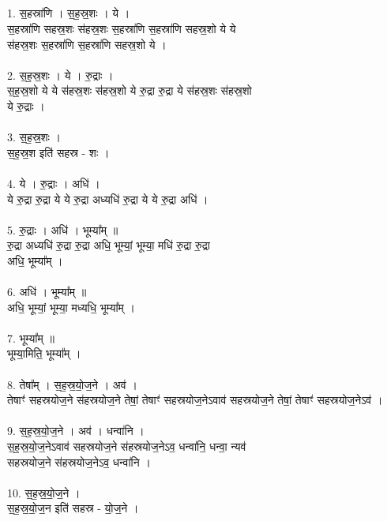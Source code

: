 \subsection{}
1. स॒हस्रा॑णि । स॒ह॒स्र॒शः । ये ।\\
स॒हस्रा॑णि सहस्र॒शः स॑हस्र॒शः स॒हस्रा॑णि स॒हस्रा॑णि सहस्र॒शो ये ये\\
स॑हस्र॒शः स॒हस्रा॑णि स॒हस्रा॑णि सहस्र॒शो ये ।\\
\\
2. स॒ह॒स्र॒शः । ये । रु॒द्राः ।\\
स॒ह॒स्र॒शो ये ये स॑हस्र॒शः स॑हस्र॒शो ये रु॒द्रा रु॒द्रा ये स॑हस्र॒शः स॑हस्र॒शो\\
ये रु॒द्राः ।\\
\\
3. स॒ह॒स्र॒शः ।\\
स॒ह॒स्र॒श इति॑ सहस्र - शः ।\\
\\
4. ये । रु॒द्राः । अधि॑ ।\\
ये रु॒द्रा रु॒द्रा ये ये रु॒द्रा अध्यधि॑ रु॒द्रा ये ये रु॒द्रा अधि॑ ।\\
\\
5. रु॒द्राः । अधि॑ । भूम्या᳚म् ॥\\
रु॒द्रा अध्यधि॑ रु॒द्रा रु॒द्रा अधि॒ भूम्यां॒ भूम्या॒ मधि॑ रु॒द्रा रु॒द्रा\\
अधि॒ भूम्या᳚म् ।\\
\\
6. अधि॑ । भूम्या᳚म् ॥\\
अधि॒ भूम्यां॒ भूम्या॒ मध्यधि॒ भूम्या᳚म् ।\\
\\
7. भूम्या᳚म् ॥\\
भूम्या॒मिति॒ भूम्या᳚म् ।\\
\\
8. तेषा᳚म् । स॒ह॒स्र॒यो॒ज॒ने । अव॑ ।\\
तेषाꣳ॑ सहस्रयोज॒ने स॑हस्रयोज॒ने तेषां॒ तेषाꣳ॑ सहस्रयोज॒नेऽवाव॑ सहस्रयोज॒ने तेषां॒ तेषाꣳ॑ सहस्रयोज॒नेऽव॑ ।\\
\\
9. स॒ह॒स्र॒यो॒ज॒ने । अव॑ । धन्वा॑नि ।\\
स॒ह॒स्र॒यो॒ज॒नेऽवाव॑ सहस्रयोज॒ने स॑हस्रयोज॒नेऽव॒ धन्वा॑नि॒ धन्वा॒ न्यव॑\\
सहस्रयोज॒ने स॑हस्रयोज॒नेऽव॒ धन्वा॑नि ।\\
\\
10. स॒ह॒स्र॒यो॒ज॒ने ।\\
स॒ह॒स्र॒यो॒ज॒न इति॑ सहस्र - यो॒ज॒ने ।\\
\\
